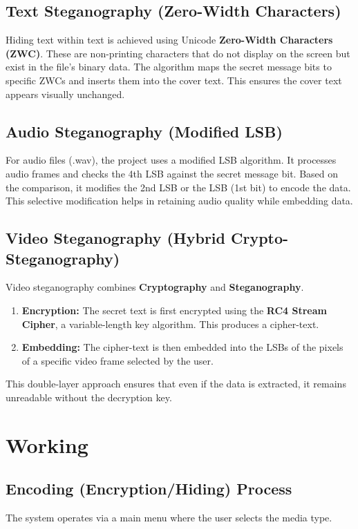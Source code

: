 \documentclass[12pt,a4paper]{report}
\begin{document}
\section{Text Steganography (Zero-Width Characters)}
Hiding text within text is achieved using Unicode \textbf{Zero-Width Characters (ZWC)}. These are non-printing characters that do not display on the screen but exist in the file's binary data. The algorithm maps the secret message bits to specific ZWCs and inserts them into the cover text. This ensures the cover text appears visually unchanged.

\section{Audio Steganography (Modified LSB)}
For audio files (.wav), the project uses a modified LSB algorithm. It processes audio frames and checks the 4th LSB against the secret message bit. Based on the comparison, it modifies the 2nd LSB or the LSB (1st bit) to encode the data. This selective modification helps in retaining audio quality while embedding data.

\section{Video Steganography (Hybrid Crypto-Steganography)}
Video steganography combines \textbf{Cryptography} and \textbf{Steganography}. 
\begin{enumerate}
    \item \textbf{Encryption:} The secret text is first encrypted using the \textbf{RC4 Stream Cipher}, a variable-length key algorithm. This produces a cipher-text.
    \item \textbf{Embedding:} The cipher-text is then embedded into the LSBs of the pixels of a specific video frame selected by the user. 
\end{enumerate}
This double-layer approach ensures that even if the data is extracted, it remains unreadable without the decryption key.

\chapter{Working}

\section{Encoding (Encryption/Hiding) Process}
The system operates via a main menu where the user selects the media type.
\end{document}
